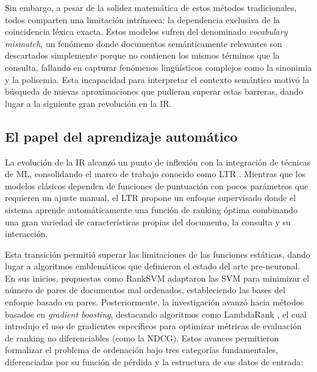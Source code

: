 Sin embargo, a pesar de la solidez matemática de estos métodos tradicionales, todos comparten una limitación intrínseca: la dependencia exclusiva de la coincidencia léxica exacta. Estos modelos sufren del denominado \textit{vocabulary mismatch}, un fenómeno donde documentos semánticamente relevantes son descartados simplemente porque no contienen los mismos términos que la consulta, fallando en capturar fenómenos lingüísticos complejos como la sinonimia y la polisemia. Esta incapacidad para interpretar el contexto semántico motivó la búsqueda de nuevas aproximaciones que pudieran superar estas barreras, dando lugar a la siguiente gran revolución en la \gls{IR}.

\subsection{El papel del aprendizaje automático}

\noindent La evolución de la \gls{IR} alcanzó un punto de inflexión con la integración de técnicas de \gls{ML}, consolidando el marco de trabajo conocido como \gls{LTR} \cite{liu2009learning}. Mientras que los modelos clásicos dependen de funciones de puntuación con pocos parámetros que requieren un ajuste manual, el \gls{LTR} propone un enfoque supervisado donde el sistema aprende automáticamente una función de ranking óptima combinando una gran variedad de características propias del documento, la consulta y su interacción.

Esta transición permitió superar las limitaciones de las funciones estáticas, dando lugar a algoritmos emblemáticos que definieron el estado del arte pre-neuronal. En sus inicios, propuestas como RankSVM \cite{joachims2002optimizing} adaptaron las \gls{SVM} para minimizar el número de pares de documentos mal ordenados, estableciendo las bases del enfoque basado en pares. Posteriormente, la investigación avanzó hacia métodos basados en \textit{gradient boosting}, destacando algoritmos como LambdaRank \cite{burges2006learning}, el cual introdujo el uso de gradientes específicos para optimizar métricas de evaluación de ranking no diferenciables (como la \gls{NDCG}). Estos avances permitieron formalizar el problema de ordenación bajo tres categorías fundamentales, diferenciadas por su función de pérdida y la estructura de sus datos de entrada:

